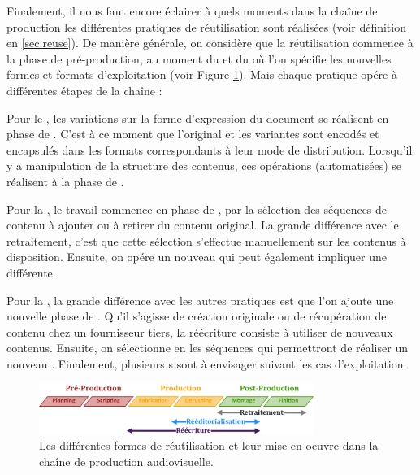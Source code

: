 Finalement, il nous faut encore éclairer à quels moments dans la chaîne de production les différentes pratiques de réutilisation sont réalisées (voir définition en \ref{sec:reuse}).
De manière générale, on considère que la réutilisation commence à la phase de pré-production, au moment du  et du  où l'on spécifie les nouvelles formes et formats d'exploitation (voir Figure \ref{img:intro:reutilisation}). 
Mais chaque pratique opére à différentes étapes de la chaîne :
\begin{liste}
	\item Pour le , les variations sur la forme d'expression du document se réalisent en phase de . 
	C'est à ce moment que l'original et les variantes sont encodés et encapsulés dans les formats correspondants à leur mode de distribution. 
	Lorsqu'il y a manipulation de la structure des contenus, ces opérations (automatisées) se réalisent à la phase de .

	\item Pour la , le travail commence en phase de , par la sélection des séquences de contenu à ajouter ou à retirer du contenu original. 
	La grande différence avec le retraitement, c'est que cette sélection s'effectue manuellement sur les contenus à disposition. 
	Ensuite, on opére un nouveau  qui peut également impliquer une  différente.

	\item Pour la , la grande différence avec les autres pratiques est que l'on ajoute une nouvelle phase de . 
	Qu'il s'agisse de création originale ou de récupération de contenu chez un fournisseur tiers, la réécriture consiste à utiliser de nouveaux contenus. 
	Ensuite, on sélectionne en  les séquences qui permettront de réaliser un nouveau . 
	Finalement, plusieurs s sont à envisager suivant les cas d'exploitation.
\end{liste}

\begin{figure}[ht!]
\centering
\includegraphics[width=0.8\textwidth]{images/Workflow-Reuse-v1.png}
\caption{Les différentes formes de réutilisation et leur mise en oeuvre dans la chaîne de production audiovisuelle.}
\label{img:intro:reutilisation}
\end{figure}








